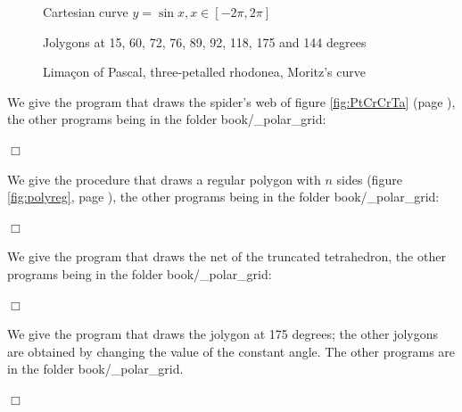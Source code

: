 \begin{figure}[htbp]
 \caption{Cartesian curve $y = \sin{x}, x \in [-2\pi, 2\pi]$}\label{fig:sin}
\end{figure}
\begin{figure}[htbp]
 \caption{Jolygons at 15, 60, 72, 76, 89, 92, 118, 175 and 144 degrees}\label{fig:jgones}
\end{figure}
\begin{figure}[htbp]
 \caption{Limaçon of Pascal, three-petalled rhodonea, Moritz's curve}\label{fig:courbpo}
\end{figure}
\begin{corrige}{
We give the program that draws the spider's web of figure \ref{fig:PtCrCrTa}
(page \pageref{fig:PtCrCrTa}), the other programs being in the folder
{\idt book/\_polar\_grid}:

\noindent $\Box$}\end{corrige}
\begin{corrige}{
We give the procedure that draws a regular polygon with $n$ sides (figure \ref{fig:polyreg},
page \pageref{fig:polyreg}), the other programs being in the folder
{\idt book/\_polar\_grid}:

\noindent $\Box$}\end{corrige}
\begin{corrige}{
We give the program that draws the net of the truncated tetrahedron, the other
programs being in the folder {\idt book/\_polar\_grid}:

\noindent $\Box$}\end{corrige}
\begin{corrige}{
We give the program that draws the jolygon at 175 degrees; the other jolygons are obtained by changing the
value of the constant {\idt angle}. The other programs are in the folder
{\idt book/\_polar\_grid}.

\noindent $\Box$}\end{corrige}

\clearpage

